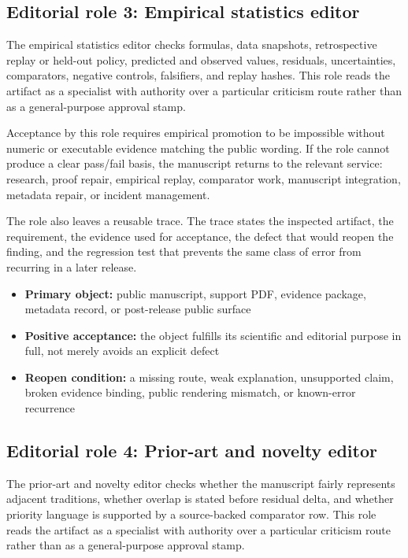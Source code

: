 \subsection{Editorial role 3: Empirical statistics editor}

The empirical statistics editor checks formulas, data snapshots, retrospective replay or held-out policy, predicted and observed values, residuals, uncertainties, comparators, negative controls, falsifiers, and replay hashes. This role reads the artifact as a specialist with authority over a particular criticism route rather than as a general-purpose approval stamp.


Acceptance by this role requires empirical promotion to be impossible without numeric or executable evidence matching the public wording. If the role cannot produce a clear pass/fail basis, the manuscript returns to the relevant service: research, proof repair, empirical replay, comparator work, manuscript integration, metadata repair, or incident management.


The role also leaves a reusable trace. The trace states the inspected artifact, the requirement, the evidence used for acceptance, the defect that would reopen the finding, and the regression test that prevents the same class of error from recurring in a later release.


\begin{itemize}[leftmargin=1.8em]

\item \textbf{Primary object:} public manuscript, support PDF, evidence package, metadata record, or post-release public surface

\item \textbf{Positive acceptance:} the object fulfills its scientific and editorial purpose in full, not merely avoids an explicit defect

\item \textbf{Reopen condition:} a missing route, weak explanation, unsupported claim, broken evidence binding, public rendering mismatch, or known-error recurrence

\end{itemize}

\subsection{Editorial role 4: Prior-art and novelty editor}

The prior-art and novelty editor checks whether the manuscript fairly represents adjacent traditions, whether overlap is stated before residual delta, and whether priority language is supported by a source-backed comparator row. This role reads the artifact as a specialist with authority over a particular criticism route rather than as a general-purpose approval stamp.


